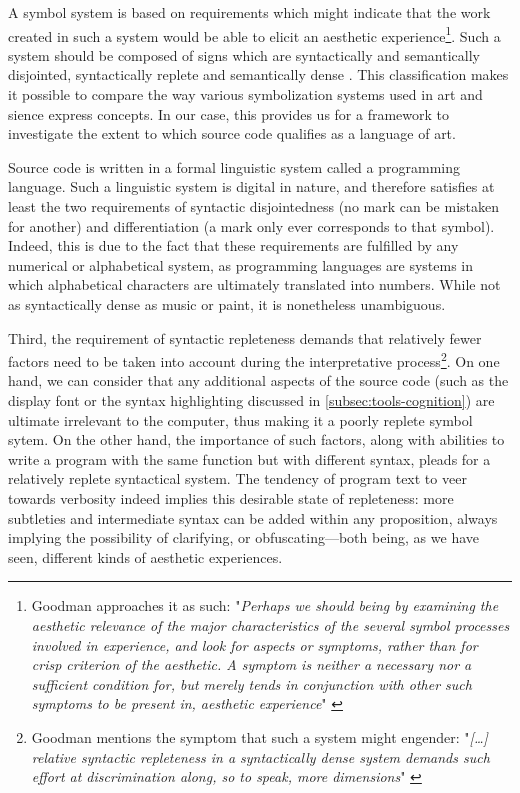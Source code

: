A symbol system is based on requirements which might indicate that the work created in such a system would be able to elicit an aesthetic experience\footnote{Goodman approaches it as such: "\emph{Perhaps we should being by examining the aesthetic relevance of the major characteristics of the several symbol processes involved in experience, and look for aspects or symptoms, rather than for crisp criterion of the aesthetic. A symptom is neither a necessary nor a sufficient condition for, but merely tends in conjunction with other such symptoms to be present in, aesthetic experience}" \citep{goodman_languages_1976}}. Such a system should be composed of signs which are syntactically and semantically disjointed, syntactically replete and semantically dense \citep{goodman_languages_1976}. This classification makes it possible to compare the way various symbolization systems used in art and sience express concepts. In our case, this provides us for a framework to investigate the extent to which source code qualifies as a language of art.

Source code is written in a formal linguistic system called a programming language. Such a linguistic system is digital in nature, and therefore satisfies at least the two requirements of syntactic disjointedness (no mark can be mistaken for another) and differentiation (a mark only ever corresponds to that symbol). Indeed, this is due to the fact that these requirements are fulfilled by any numerical or alphabetical system, as programming languages are systems in which alphabetical characters are ultimately translated into numbers. While not as syntactically dense as music or paint, it is nonetheless unambiguous.

Third, the requirement of syntactic repleteness demands that relatively fewer factors need to be taken into account during the interpretative process\footnote{Goodman mentions the symptom that such a system might engender: "\emph{[\dots] relative syntactic repleteness in a syntactically dense system demands such effort at discrimination along, so to speak, more dimensions}" \citep{goodman_languages_1976}}. On one hand, we can consider that any additional aspects of the source code (such as the display font or the syntax highlighting discussed in \autoref{subsec:tools-cognition}) are ultimate irrelevant to the computer, thus making it a poorly replete symbol sytem. On the other hand, the importance of such factors, along with abilities to write a program with the same function but with different syntax, pleads for a relatively replete syntactical system. The tendency of program text to veer towards verbosity indeed implies this desirable state of repleteness: more subtleties and intermediate syntax can be added within any proposition, always implying the possibility of clarifying, or obfuscating—both being, as we have seen, different kinds of aesthetic experiences.

